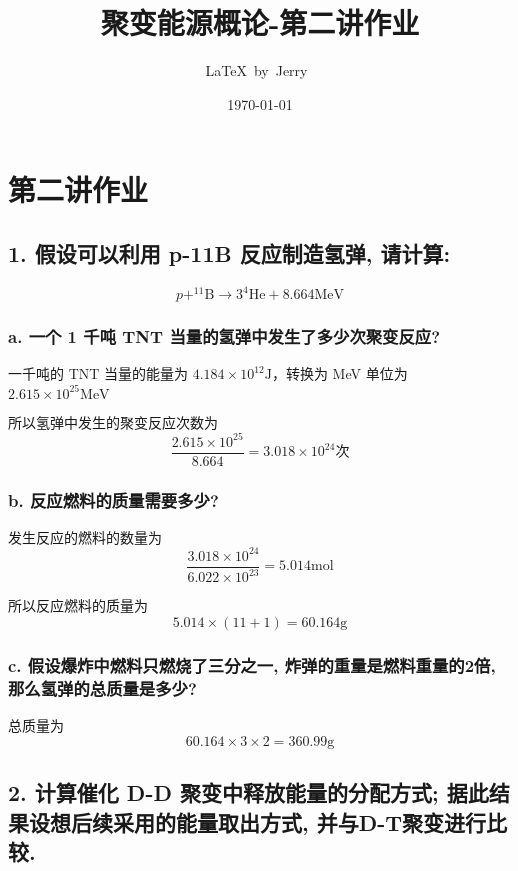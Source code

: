 \documentclass{article}
\title{聚变能源概论-第二讲作业}
\author{\LaTeX\ by\ Jerry\ }
\date{\today}
\begin{document}
\pagestyle{fancy}

\fancyhead[R]{\today}

\section*{第二讲作业}

\subsection*{1. 假设可以利用 p-11B 反应制造氢弹, 请计算: }

$$ p + ^{11}\text{B} \rightarrow 3 ^{4}\text{He} + 8.664 \text{MeV}$$

\subsubsection*{a. 一个 1 千吨 TNT 当量的氢弹中发生了多少次聚变反应? }

一千吨的 TNT 当量的能量为 $4.184 \times {10}^{12} \text{J}$\cite{TNT-equivalent}，转换为 MeV 单位为 $2.615 \times {10}^{25} \text{MeV}$

所以氢弹中发生的聚变反应次数为 $$\frac{2.615 \times {10}^{25}}{8.664} = 3.018 \times {10}^{24} \text{次}$$

\subsubsection*{b. 反应燃料的质量需要多少? }

发生反应的燃料的数量为 $$\frac{3.018 \times {10}^{24}}{6.022 \times {10}^{23}} = 5.014 \text{mol}$$

所以反应燃料的质量为 $$5.014 \times (11+1) = 60.164 \text{g}$$

\subsubsection*{c. 假设爆炸中燃料只燃烧了三分之一, 炸弹的重量是燃料重量的2倍, 那么氢弹的总质量是多少? }

总质量为 $$60.164 \times 3 \times 2 = 360.99 \text{g}$$

\subsection*{2. 计算催化 D-D 聚变中释放能量的分配方式; 据此结果设想后续采用的能量取出方式, 并与D-T聚变进行比较. }
\end{document}
